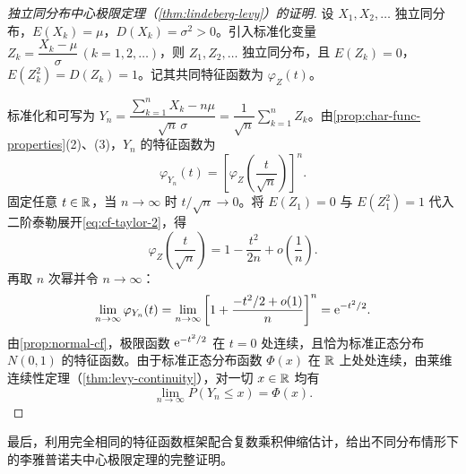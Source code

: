 \begin{proof}[独立同分布中心极限定理（\cref{thm:lindeberg-levy}）的证明]
设 $X_1,X_2,\ldots$ 独立同分布，$E(X_k)=\mu$，$D(X_k)=\sigma^2>0$。引入标准化变量 $Z_k=\dfrac{X_k-\mu}{\sigma}\,(k=1,2,\ldots)$，则 $Z_1,Z_2,\ldots$ 独立同分布，且 $E(Z_k)=0$，$E(Z_k^2)=D(Z_k)=1$。记其共同特征函数为 $\varphi_Z(t)$。

标准化和可写为 $Y_n=\dfrac{\sum_{k=1}^{n}X_k-n\mu}{\sqrt{n}\,\sigma}=\dfrac{1}{\sqrt{n}}\sum_{k=1}^{n}Z_k$。由\cref{prop:char-func-properties}(2)、(3)，$Y_n$ 的特征函数为
\[
  \varphi_{Y_n}(t)=\left[\varphi_Z\!\left(\frac{t}{\sqrt{n}}\right)\right]^n.
\]
固定任意 $t\in\mathbb{R}$，当 $n\to\infty$ 时 $t/\sqrt{n}\to 0$。将 $E(Z_1)=0$ 与 $E(Z_1^2)=1$ 代入二阶泰勒展开\eqref{eq:cf-taylor-2}，得
\[
  \varphi_Z\!\left(\frac{t}{\sqrt{n}}\right)
  =1-\frac{t^2}{2n}+o\!\left(\frac{1}{n}\right).
\]
再取 $n$ 次幂并令 $n\to\infty$：
\[
  \lim_{n\to\infty}\varphi_{Y_n}(t)
  =\lim_{n\to\infty}\left[1+\frac{-t^2/2+o(1)}{n}\right]^n
  =\mathrm{e}^{-t^2/2}.
\]
由\cref{prop:normal-cf}，极限函数 $\mathrm{e}^{-t^2/2}$ 在 $t=0$ 处连续，且恰为标准正态分布 $N(0,1)$ 的特征函数。由于标准正态分布函数 $\Phi(x)$ 在 $\mathbb{R}$ 上处处连续，由莱维连续性定理（\cref{thm:levy-continuity}），对一切 $x\in\mathbb{R}$ 均有
\[
  \lim_{n\to\infty}P(Y_n\le x)=\Phi(x).
\]
\end{proof}

最后，利用完全相同的特征函数框架配合复数乘积伸缩估计，给出不同分布情形下的李雅普诺夫中心极限定理的完整证明。

